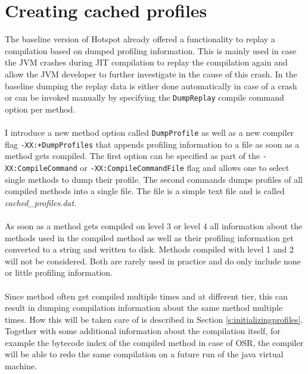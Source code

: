 \section{Creating cached profiles}
\label{s:creatingprofiles}
The baseline version of Hotspot already offered a functionality to replay a compilation based on dumped profiling information.
This is mainly used in case the JVM crashes during JIT compilation to replay the compilation again and allow the JVM developer to further investigate in the cause of this crash.
In the baseline dumping the replay data is either done automatically in case of a crash or can be invoked manually by specifying the \texttt{DumpReplay} compile command option per method.
\\\\
I introduce a new method option called \texttt{DumpProfile} as well as a new compiler flag \texttt{-XX:+DumpProfiles} that appends profiling information to a file as soon as a method gets compiled. The first option can be specified as part of the \texttt{-XX:CompileCommand} or \texttt{-XX:CompileCommandFile} flag and allows one to select single methods to dump their profile. The second commands dumps profiles of all compiled methods into a single file.
The file is a simple text file and is called \textit{cached\_profiles.dat}.
\\\\
As soon as a method gets compiled on level 3 or level 4 all information about the methods used in the compiled method as well as their profiling information get converted to a string and written to disk. Methods compiled with level 1 and 2 will not be considered. Both are rarely used in practice and do only include none or little profiling information.
\\\\
Since method often get compiled multiple times and at different tier, this can result in dumping compilation information about the same method multiple times. How this will be taken care of is described in Section \ref{s:initializingprofiles}.
Together with some additional information about the compilation itself, for example the bytecode index of the compiled method in case of OSR, the compiler will be able to redo the same compilation on a future run of the java virtual machine.  
